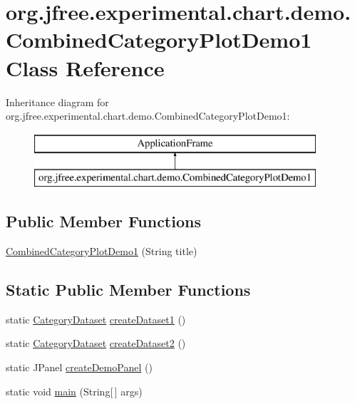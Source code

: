 \hypertarget{classorg_1_1jfree_1_1experimental_1_1chart_1_1demo_1_1_combined_category_plot_demo1}{}\section{org.\+jfree.\+experimental.\+chart.\+demo.\+Combined\+Category\+Plot\+Demo1 Class Reference}
\label{classorg_1_1jfree_1_1experimental_1_1chart_1_1demo_1_1_combined_category_plot_demo1}
Inheritance diagram for org.\+jfree.\+experimental.\+chart.\+demo.\+Combined\+Category\+Plot\+Demo1\+:\begin{figure}[H]
\begin{center}
\leavevmode
\includegraphics[height=2.000000cm]{classorg_1_1jfree_1_1experimental_1_1chart_1_1demo_1_1_combined_category_plot_demo1}
\end{center}
\end{figure}
\subsection*{Public Member Functions}
\begin{DoxyCompactItemize}
\item 
\mbox{\hyperlink{classorg_1_1jfree_1_1experimental_1_1chart_1_1demo_1_1_combined_category_plot_demo1_a781eb251501cfb078beb912e9a53aab4}{Combined\+Category\+Plot\+Demo1}} (String title)
\end{DoxyCompactItemize}
\subsection*{Static Public Member Functions}
\begin{DoxyCompactItemize}
\item 
static \mbox{\hyperlink{interfaceorg_1_1jfree_1_1data_1_1category_1_1_category_dataset}{Category\+Dataset}} \mbox{\hyperlink{classorg_1_1jfree_1_1experimental_1_1chart_1_1demo_1_1_combined_category_plot_demo1_a94fcbc19ee680a142d7b1dee869026d7}{create\+Dataset1}} ()
\item 
static \mbox{\hyperlink{interfaceorg_1_1jfree_1_1data_1_1category_1_1_category_dataset}{Category\+Dataset}} \mbox{\hyperlink{classorg_1_1jfree_1_1experimental_1_1chart_1_1demo_1_1_combined_category_plot_demo1_aeb8d4cc73fee331ccec4f6fd88b1f7f8}{create\+Dataset2}} ()
\item 
static J\+Panel \mbox{\hyperlink{classorg_1_1jfree_1_1experimental_1_1chart_1_1demo_1_1_combined_category_plot_demo1_a170b99739207cce50e2886a15d00e778}{create\+Demo\+Panel}} ()
\item 
static void \mbox{\hyperlink{classorg_1_1jfree_1_1experimental_1_1chart_1_1demo_1_1_combined_category_plot_demo1_a33b6308c6534361593cba600b400c098}{main}} (String\mbox{[}$\,$\mbox{]} args)
\end{DoxyCompactItemize}


